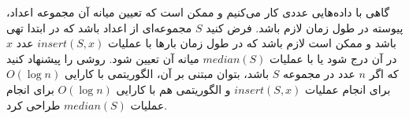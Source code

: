 \documentclass[]{article}
\begin{document}
گاهی با داده‌هایی عددی کار می‌کنیم
و ممکن است که تعیین میانه آن مجموعه اعداد، پیوسته در طول زمان لازم باشد.
فرض کنید
$S$
مجموعه‌ای ‌از اعداد باشد که در ابتدا تهی باشد و ممکن است لازم باشد
که در طول زمان بارها با عملیات
$insert(S, x)$
عدد
$x$
در آن درج ‌شود یا با عملیات
$median(S)$
میانه آن تعیین ‌شود. روشی را پیشنهاد کنید که اگر
$n$
عدد در مجموعه
$S$
باشد،
بتوان مبتنی بر آن، الگوریتمی با کارایی
$O(\log n)$
برای انجام عملیات
$insert(S, x)$
و الگوریتمی هم با کارایی
$O(\log n)$
برای انجام عملیات
$median(S)$
طراحی کرد.
\end{document}
